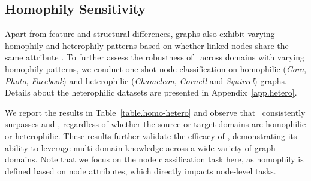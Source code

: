 \subsection{Homophily Sensitivity}\label{sec.hetero}
Apart from feature and structural differences, graphs also exhibit varying homophily and heterophily patterns based on whether linked nodes share the same attribute \cite{ma2021homophily,zhu2020beyond,yu2024non}. To further assess the robustness of \model\ across domains with varying homophily patterns, we conduct one-shot node classification on  homophilic (\textit{Cora}, \textit{Photo}, \textit{Facebook}) and heterophilic (\textit{Chameleon}, \textit{Cornell} and \textit{Squirrel}) graphs. Details about the heterophilic datasets are presented in Appendix~\ref{app.hetero}. 

We report the results in Table~\ref{table.homo-hetero} and observe that \model\ consistently surpasses  and , regardless of whether the source or target domains are homophilic or heterophilic. 
These results further validate the efficacy of \model, demonstrating its ability to leverage multi-domain knowledge across a wide variety of graph domains. Note that we focus on the node classification task here, as homophily is defined based on node attributes, which directly impacts node-level tasks.







